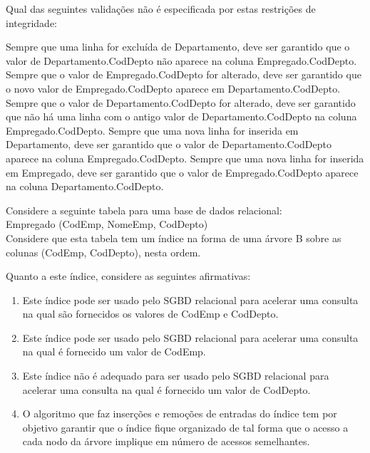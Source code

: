 \documentclass[12pt, addpoints]{exam}
\begin{document}
\begin{questions}
Qual das seguintes validações não é especificada por estas restrições de integridade:
\begin{choices}
\choice Sempre que uma linha for excluída de Departamento, deve ser garantido que o valor de Departamento.CodDepto não aparece na coluna Empregado.CodDepto.
\choice Sempre que o valor de Empregado.CodDepto for alterado, deve ser garantido que o novo valor de Empregado.CodDepto aparece em Departamento.CodDepto.
\choice Sempre que o valor de Departamento.CodDepto for alterado, deve ser garantido que não há uma linha com o antigo valor de Departamento.CodDepto na coluna Empregado.CodDepto.
\choice Sempre que uma nova linha for inserida em Departamento, deve ser garantido que o valor de Departamento.CodDepto aparece na coluna Empregado.CodDepto.
\choice Sempre que uma nova linha for inserida em Empregado, deve ser garantido que o valor de Empregado.CodDepto aparece na coluna Departamento.CodDepto.
\end{choices}

\question

Considere a seguinte tabela para uma base de dados relacional:\\

Empregado (CodEmp, NomeEmp, CodDepto)\\

Considere que esta tabela tem um índice na forma de uma árvore B sobre as colunas (CodEmp, CodDepto), nesta ordem.

Quanto a este índice, considere as seguintes afirmativas:

\begin{enumerate}

    \item Este índice pode ser usado pelo SGBD relacional para acelerar uma consulta na qual são fornecidos os valores de CodEmp e CodDepto.

    \item Este índice pode ser usado pelo SGBD relacional para acelerar uma consulta na qual é fornecido um valor de CodEmp.

    \item Este índice não é adequado para ser usado pelo SGBD relacional para acelerar uma consulta na qual é fornecido um valor de CodDepto.

    \item O algoritmo que faz inserções e remoções de entradas do índice tem por objetivo garantir que o índice fique organizado de tal forma que o acesso a cada nodo da árvore implique em número de acessos semelhantes.


\end{enumerate}
\end{questions}
\end{document}
